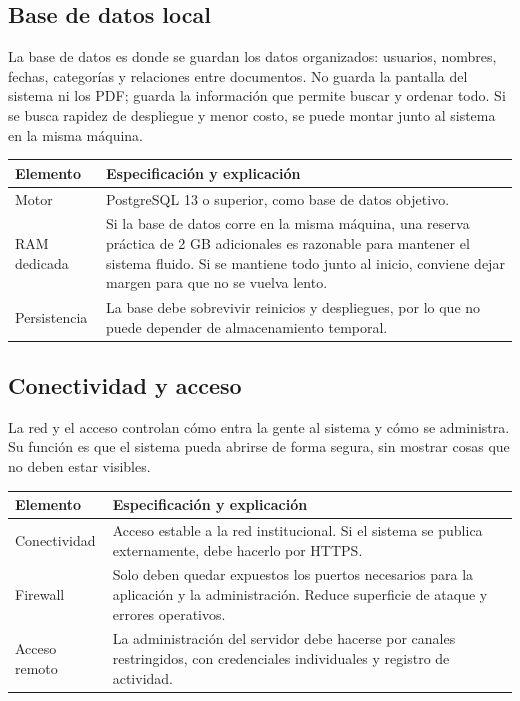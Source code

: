 \documentclass[12pt,a4paper]{report}
\begin{document}
\subsection*{Base de datos local}
La base de datos es donde se guardan los datos organizados: usuarios, nombres, fechas, categorías y relaciones entre documentos. No guarda la pantalla del sistema ni los PDF; guarda la información que permite buscar y ordenar todo.
Si se busca rapidez de despliegue y menor costo, se puede montar junto al sistema en la misma máquina.
\begin{longtable}{p{} p{}}
\toprule
\textbf{Elemento} & \textbf{Especificación y explicación} \\
\midrule
Motor & PostgreSQL 13 o superior, como base de datos objetivo. \\
RAM dedicada & Si la base de datos corre en la misma máquina, una reserva práctica de 2 GB adicionales es razonable para mantener el sistema fluido. Si se mantiene todo junto al inicio, conviene dejar margen para que no se vuelva lento. \\
Persistencia & La base debe sobrevivir reinicios y despliegues, por lo que no puede depender de almacenamiento temporal. \\
\bottomrule
\end{longtable}

\subsection*{Conectividad y acceso}
La red y el acceso controlan cómo entra la gente al sistema y cómo se administra. Su función es que el sistema pueda abrirse de forma segura, sin mostrar cosas que no deben estar visibles.
\begin{longtable}{p{} p{}}
\toprule
\textbf{Elemento} & \textbf{Especificación y explicación} \\
\midrule
Conectividad & Acceso estable a la red institucional. Si el sistema se publica externamente, debe hacerlo por HTTPS. \\
Firewall & Solo deben quedar expuestos los puertos necesarios para la aplicación y la administración. Reduce superficie de ataque y errores operativos. \\
Acceso remoto & La administración del servidor debe hacerse por canales restringidos, con credenciales individuales y registro de actividad. \\
\bottomrule
\end{longtable}
\end{document}
